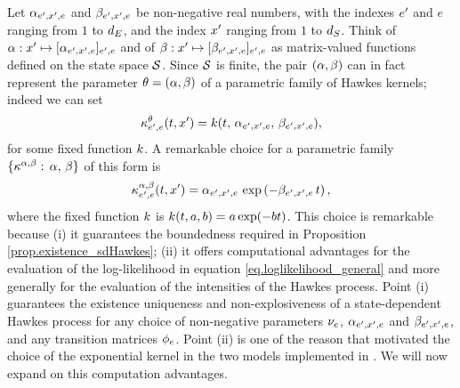 \documentclass[10pt]{article}
\begin{document}
Let $\alpha_{e^{\prime},x^{\prime}, e}$ and $\beta_{e^{\prime},x^{\prime}, e}$ be non-negative real numbers, with the indexes $e^{\prime}$ and $e$ ranging from $1$ to $d_{E}$, and the index $x^{\prime}$ ranging from $1$ to $d_{S}$. Think of $\alpha: x^{\prime} \mapsto [\alpha_{e^{\prime},x^{\prime},e}]_{e^{\prime},e}$ and of $\beta: x^{\prime} \mapsto [\beta_{e^{\prime},x^{\prime},e}]_{e^{\prime},e}$ as matrix-valued functions defined on the state space $\mathcal{S}$. Since $\mathcal{S}$ is finite, the pair $(\alpha,\beta)$ can in fact represent the parameter $\theta = (\alpha,\beta)$ of a parametric family of Hawkes kernels; indeed we can set
\begin{equation}\label{eq.parametric_hawkes_kernel_general}
 \kappa^{\theta}_{e^{\prime},e}(t,x^{\prime})
 = k(t,\, \alpha_{e^{\prime},x^{\prime},e},\, \beta_{e^{\prime},x^{\prime},e}),
\end{equation}
for some fixed function $k$.
A remarkable choice for a parametric family $\lbrace \kappa^{\alpha,\beta}: \, \alpha, \, \beta\rbrace$ of this form is 
\begin{equation}
 \kappa^{\alpha,\beta}_{e^{\prime},e}(t,x^{\prime}) = \alpha_{e^{\prime},x^{\prime},e} \, \exp\left( -\beta_{e^{\prime},x^{\prime},e} \, t \right),
\end{equation}
where the fixed function $k$ is $k(t,a,b)=a\exp(-bt)$.
This choice is remarkable because (i) it guarantees the boundedness required in Proposition \ref{prop.existence_sdHawkes}; (ii) it offers computational advantages for the evaluation of the log-likelihood in equation \eqref{eq.loglikelihood_general} and more generally for the evaluation of the intensities of the Hawkes process. 
Point (i) guarantees the existence uniqueness and non-explosiveness of a state-dependent Hawkes process for any choice of non-negative parameters $\nu_e$, 
$\alpha_{e^{\prime},x^{\prime}, e}$ and $\beta_{e^{\prime},x^{\prime}, e}$, and any transition matrices $\phi_e$. Point (ii) is one of the reason that motivated the choice of the exponential kernel in the two models implemented in \cite{MP18sta}. We will now expand on this computation advantages. 
\end{document}
